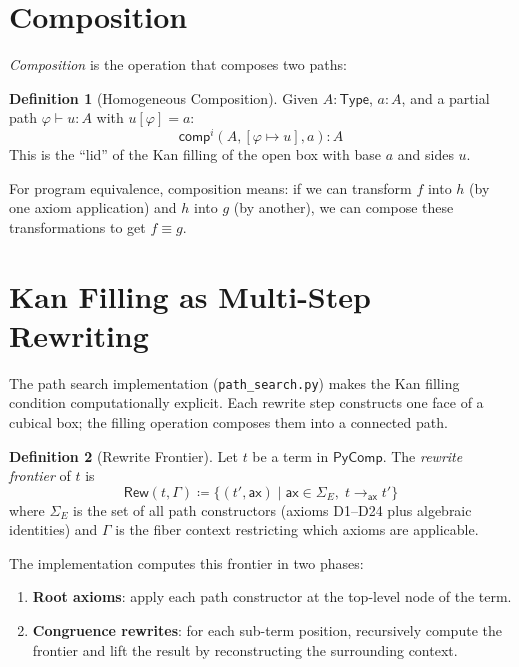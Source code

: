\documentclass[11pt,a4paper]{report}
\theoremstyle{definition}
\newtheorem{definition}{Definition}[chapter]
\theoremstyle{plain}
\newcommand{\Type}{\mathsf{Type}}
\newcommand{\comp}{\mathsf{comp}}
\begin{document}
\section{Composition}

\emph{Composition} is the operation that composes two paths:

\begin{definition}[Homogeneous Composition]
Given $A : \Type$, $a : A$, and a partial path
$\varphi \vdash u : A$ with $u[\varphi] = a$:
\[
  \comp^i(A, [\varphi \mapsto u], a) : A
\]
This is the ``lid'' of the Kan filling of the open box with base $a$
and sides $u$.
\end{definition}

For program equivalence, composition means: if we can transform
$f$ into $h$ (by one axiom application) and $h$ into $g$ (by
another), we can compose these transformations to get $f \equiv g$.

\section{Kan Filling as Multi-Step Rewriting}

The path search implementation (\texttt{path\_search.py}) makes the
Kan filling condition computationally explicit.  Each rewrite step
constructs one face of a cubical box; the filling operation composes
them into a connected path.

\begin{definition}[Rewrite Frontier]
\label{def:rewrite-frontier}
Let $t$ be a term in $\mathsf{PyComp}$.  The \emph{rewrite frontier}
of $t$ is
\[
  \mathsf{Rew}(t, \Gamma) \coloneqq
    \bigl\{(t', \mathsf{ax}) \;\big|\;
    \mathsf{ax} \in \Sigma_E,\;
    t \to_{\mathsf{ax}} t'\bigr\}
\]
where $\Sigma_E$ is the set of all path constructors (axioms D1--D24
plus algebraic identities) and $\Gamma$ is the fiber context
restricting which axioms are applicable.
\end{definition}

The implementation computes this frontier in two phases:
\begin{enumerate}
  \item \textbf{Root axioms}: apply each path constructor at the
    top-level node of the term.
  \item \textbf{Congruence rewrites}: for each sub-term position,
    recursively compute the frontier and lift the result by
    reconstructing the surrounding context.
\end{enumerate}
\end{document}
